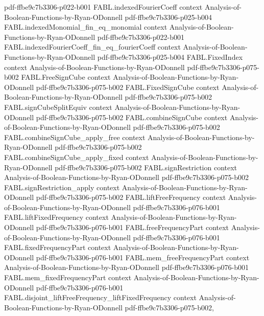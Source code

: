 \begin{theorem}
  {pdf-ffbe9c7b3306-p022-b001}
\proofstep
  {FABL.indexedFourierCoeff}
  {context}
  {Analysis-of-Boolean-Functions-by-Ryan-ODonnell}
  {pdf-ffbe9c7b3306-p025-b004}
\proofstep
  {FABL.indexedMonomial_fin_eq_monomial}
  {context}
  {Analysis-of-Boolean-Functions-by-Ryan-ODonnell}
  {pdf-ffbe9c7b3306-p022-b001}
\proofstep
  {FABL.indexedFourierCoeff_fin_eq_fourierCoeff}
  {context}
  {Analysis-of-Boolean-Functions-by-Ryan-ODonnell}
  {pdf-ffbe9c7b3306-p025-b004}
\proofstep
  {FABL.FixedIndex}
  {context}
  {Analysis-of-Boolean-Functions-by-Ryan-ODonnell}
  {pdf-ffbe9c7b3306-p075-b002}
\proofstep
  {FABL.FreeSignCube}
  {context}
  {Analysis-of-Boolean-Functions-by-Ryan-ODonnell}
  {pdf-ffbe9c7b3306-p075-b002}
\proofstep
  {FABL.FixedSignCube}
  {context}
  {Analysis-of-Boolean-Functions-by-Ryan-ODonnell}
  {pdf-ffbe9c7b3306-p075-b002}
\proofstep
  {FABL.signCubeSplitEquiv}
  {context}
  {Analysis-of-Boolean-Functions-by-Ryan-ODonnell}
  {pdf-ffbe9c7b3306-p075-b002}
\proofstep
  {FABL.combineSignCube}
  {context}
  {Analysis-of-Boolean-Functions-by-Ryan-ODonnell}
  {pdf-ffbe9c7b3306-p075-b002}
\proofstep
  {FABL.combineSignCube_apply_free}
  {context}
  {Analysis-of-Boolean-Functions-by-Ryan-ODonnell}
  {pdf-ffbe9c7b3306-p075-b002}
\proofstep
  {FABL.combineSignCube_apply_fixed}
  {context}
  {Analysis-of-Boolean-Functions-by-Ryan-ODonnell}
  {pdf-ffbe9c7b3306-p075-b002}
\proofstep
  {FABL.signRestriction}
  {context}
  {Analysis-of-Boolean-Functions-by-Ryan-ODonnell}
  {pdf-ffbe9c7b3306-p075-b002}
\proofstep
  {FABL.signRestriction_apply}
  {context}
  {Analysis-of-Boolean-Functions-by-Ryan-ODonnell}
  {pdf-ffbe9c7b3306-p075-b002}
\proofstep
  {FABL.liftFreeFrequency}
  {context}
  {Analysis-of-Boolean-Functions-by-Ryan-ODonnell}
  {pdf-ffbe9c7b3306-p076-b001}
\proofstep
  {FABL.liftFixedFrequency}
  {context}
  {Analysis-of-Boolean-Functions-by-Ryan-ODonnell}
  {pdf-ffbe9c7b3306-p076-b001}
\proofstep
  {FABL.freeFrequencyPart}
  {context}
  {Analysis-of-Boolean-Functions-by-Ryan-ODonnell}
  {pdf-ffbe9c7b3306-p076-b001}
\proofstep
  {FABL.fixedFrequencyPart}
  {context}
  {Analysis-of-Boolean-Functions-by-Ryan-ODonnell}
  {pdf-ffbe9c7b3306-p076-b001}
\proofstep
  {FABL.mem_freeFrequencyPart}
  {context}
  {Analysis-of-Boolean-Functions-by-Ryan-ODonnell}
  {pdf-ffbe9c7b3306-p076-b001}
\proofstep
  {FABL.mem_fixedFrequencyPart}
  {context}
  {Analysis-of-Boolean-Functions-by-Ryan-ODonnell}
  {pdf-ffbe9c7b3306-p076-b001}
\proofstep
  {FABL.disjoint_liftFreeFrequency_liftFixedFrequency}
  {context}
  {Analysis-of-Boolean-Functions-by-Ryan-ODonnell}
  {pdf-ffbe9c7b3306-p075-b002,
}
\end{theorem}
